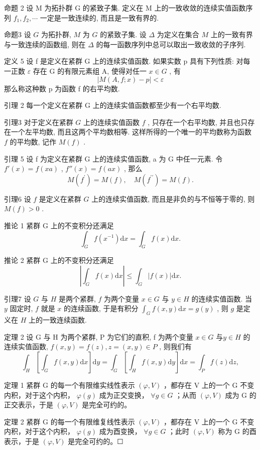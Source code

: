 \documentclass[]{article}
\begin{document}
命题 2 设 M 为拓扑群 G 的紧致子集. 定义在 M 上的一致收敛的连续实值函数序列 $f_{1}, f_{2}, \cdots$ 一定是一致连续的, 而且是一致有界的. 

命题3 设 $G$ 为拓扑群, $M$ 为 $G$ 的紧致子集. 设 $\Delta$ 为定义在集合 $M$ 上的一致有界与一致连续的函数组, 则在 $\Delta$ 的每一函数序列中总可以取出一致收敛的子序列. 

定义 5 设 f 是定义在紧群 G 上的连续实值函数. 如果实数 p 具有下列性质: 对每一正数 $\varepsilon$ 存在 G 的有限元素组 A, 使得对任一 $x \in G$ , 有$$
\left| M (A, f; x) - p \right| <   \varepsilon 
$$  那么称这种数 p 为函数 f 的右平均数. 

引理 2 每一个定义在紧群 G 上的连续实值函数都至少有一个右平均数. 

引理3 对于定义在紧群 $G$ 上的连续实值函数 $f$ , 只存在一个右平均数, 并且也只存在一个左平均数, 而且这两个平均数相等. 这样所得的一个唯一的平均数称为函数 $f$ 的平均数, 记作 $M(f)$ . 

引理 5 设 f 为定义在紧群 G 上的连续实值函数, a 为 G 中任一元素. 令 $f'(x) = f(xa)$ , $f''(x) = f(ax)$ , 那么$$
M (f ^ {\prime}) = M (f), \quad M (f ^ {\prime \prime}) = M (f).
$$

引理6 设 $f$ 是定义在紧群 $G$ 上的连续实值函数, 而且是非负的与不恒等于零的, 则 $M(f) > 0$ . 

推论 1 紧群 G 上的不变积分还满足$$
\int_ {G} f (x ^ {- 1}) \mathrm{d} x = \int_ {G} f (x) \mathrm{d} x. 
$$

推论 2 紧群 G 上的不变积分还满足$$
\left| \int_ {G} f (x) \mathrm{d} x \right| \leqslant \int_ {G} | f (x) | \mathrm{d} x. 
$$

引理7 设 $G$ 与 $H$ 是两个紧群, $f$ 为两个变量 $x \in G$ 与 $y \in H$ 的连续实值函数. 当 $y$ 固定时, $f$ 就是 $x$ 的连续函数, 于是有积分 $\int_{G} f(x, y) \mathrm{d}x = g(y)$ , 则 $g$ 是定义在 $H$ 上的一致连续函数. 

定理 2 设 G 与 H 为两个紧群, P 为它们的直积, f 为两个变量 $x \in G$ 与$y \in H$ 的连续实值函数, $f(x, y) = f(z), z = (x, y) \in P$ , 则我们有 $$
\int_ {H} \left[ \int_ {G} f (x, y) \mathrm{d} x \right] \mathrm{d} y = \int_ {G} \left[ \int_ {H} f (x, y) \mathrm{d} y \right] \mathrm{d} x = \int_ {P} f (z) \mathrm{d} z,
$$

定理 1 紧群 G 的每一个有限维实线性表示 $(\varphi, V)$ ，都存在 V 上的一个 G 不变内积，对于这个内积， $\varphi(g)$ 成为正交变换， $\forall g \in G$ ；从而 $(\varphi, V)$ 成为 G 的正交表示，于是 $(\varphi, V)$ 是完全可约的。 

定理 2 紧群 G 的每一个有限维复线性表示 $(\varphi, V)$ ，都存在 V 上的一个 G 不变内积，对于这个内积， $\varphi(g)$ 成为酉变换， $\forall g \in G$ ；此时 $(\varphi, V)$ 称为 G 的酉表示，于是 $(\varphi, V)$ 是完全可约的。☐ 
\end{document}

